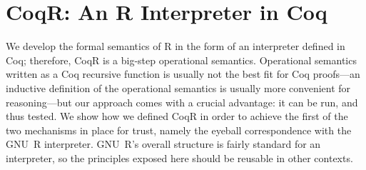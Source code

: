 \documentclass[
    sigplan,
    10pt,
    review, %
    natbib=false %
 ]{acmart}
\newcommand\mb[1]{\todo[color=purple!20,size=\scriptsize]{#1}}
\newcommand\et[1]{\todo[color=blue!20,size=\scriptsize]{#1}}
\newcommand\eti[1]{\todo[color=blue!20,inline]{#1}}
\newcommand\CoqR{CoqR}
\newcommand\newtext[1]{{\color{blue} #1}}
\begin{document}



%
%




\section{\CoqR: An R Interpreter in Coq}
\label{sec:coq:interp}

We develop the formal semantics of R in the form of an interpreter defined in Coq; therefore, \CoqR{} is a big-step operational semantics.
Operational semantics written as a Coq recursive function is usually not the best fit for Coq proofs---an inductive definition of the operational semantics is usually more convenient for reasoning---but our approach comes with a crucial advantage: it can be run, and thus tested.
%
We show how we defined \CoqR{} in order to achieve the first of the two mechanisms in place for trust, 
namely the eyeball correspondence with the GNU~R interpreter.
%
\newtext{GNU~R's overall structure is fairly standard for an interpreter, so the principles exposed here should be reusable in other contexts.}
\end{document}
